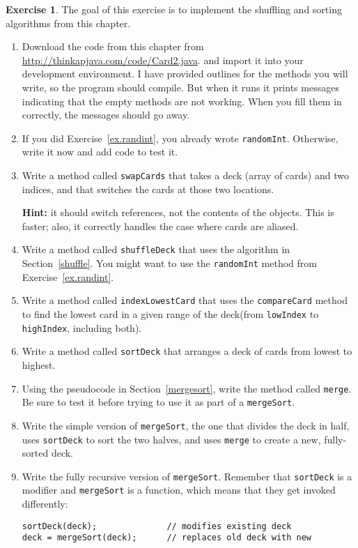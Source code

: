 \documentclass[12pt]{book}
\def\HINT{\textbf{Hint:}}
\theoremstyle{definition}
\newtheorem{excz}{Exercise}[chapter]
\newenvironment{exercise}{\bigskip\begin{excz}\mbox{}}{\end{excz}}
\begin{document}
\begin{exercise}
The goal of this exercise is to implement the shuffling and
sorting algorithms from this chapter.

\begin{enumerate}

\item Download the code from this chapter from 
\url{http://thinkapjava.com/code/Card2.java}.
and import it into your development environment.  I have
provided outlines for the methods you will write, so the
program should compile.  But when it runs it prints messages
indicating that the empty methods are not working.  When you
fill them in correctly, the messages should go away.

\item If you did Exercise~\ref{ex.randint}, you already wrote
{\tt randomInt}.  Otherwise, write it now and add code to test it.

\item Write a method called {\tt swapCards} that takes a
deck (array of cards) and two indices, and that switches
the cards at those two locations.

\HINT{} it should switch references, not
the contents of the objects.  This is faster; also, it
correctly handles the case where cards are aliased.

\item Write a method called {\tt shuffleDeck} that uses the algorithm
in Section~\ref{shuffle}.  You might want to use the {\tt randomInt}
method from Exercise~\ref{ex.randint}.

\item Write a method called {\tt indexLowestCard} that uses
the {\tt compareCard} method to find the lowest card
in a given range of the deck(from {\tt lowIndex} to {\tt highIndex},
including both).

\item Write a method called {\tt sortDeck} that arranges
a deck of cards from lowest to highest.

\item Using the pseudocode in Section~\ref{mergesort}, write the
method called {\tt merge}.  Be sure to test it before trying to use it
as part of a {\tt mergeSort}.

\item Write the simple version of {\tt mergeSort}, the one that
divides the deck in half, uses {\tt sortDeck} to sort the two
halves, and uses {\tt merge} to create a new, fully-sorted deck.

\item Write the fully recursive version of {\tt mergeSort}.
Remember that {\tt sortDeck} is a modifier and {\tt mergeSort} is
a function, which means that they get invoked differently:

\begin{lstlisting}
sortDeck(deck);              // modifies existing deck
deck = mergeSort(deck);      // replaces old deck with new
\end{lstlisting}

\end{enumerate}
\end{exercise}
\end{document}
